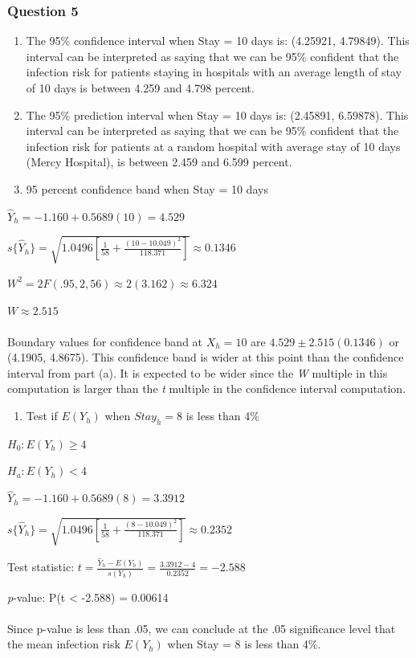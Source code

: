 \documentclass{article}
\providecommand{\tightlist}{%
      \setlength{\itemsep}{0pt}\setlength{\parskip}{0pt}}
\begin{document}
    \subsubsection{Question 5}\label{question-5}

\begin{enumerate}
\def\labelenumi{\alph{enumi}.}
\item
  The 95\% confidence interval when Stay = 10 days is: (4.25921,
  4.79849). This interval can be interpreted as saying that we can be
  95\% confident that the infection risk for patients staying in
  hospitals with an average length of stay of 10 days is between 4.259
  and 4.798 percent.
\item
  The 95\% prediction interval when Stay = 10 days is: (2.45891,
  6.59878). This interval can be interpreted as saying that we can be
  95\% confident that the infection risk for patients at a random
  hospital with average stay of 10 days (Mercy Hospital), is between
  2.459 and 6.599 percent.
\item
  95 percent confidence band when Stay = 10 days
\end{enumerate}

\(\hat{Y}_h = -1.160 + 0.5689 (10) = 4.529\)

\(s\{\hat{Y}_h\} = \sqrt{1.0496 \left[ \frac{1}{58} + \frac{(10 - 10.049)^2}{118.371} \right]} \approx 0.1346\)

\(W^2 = 2F(.95, 2, 56) \approx 2(3.162) \approx 6.324\)

\(W \approx 2.515\)
\mbox{ }\\ \mbox{ }\\
Boundary values for confidence band at \(X_h = 10\) are
\(4.529 \pm 2.515(0.1346)\) or (4.1905, 4.8675). This confidence band is
wider at this point than the confidence interval from part (a). It is
expected to be wider since the \emph{W} multiple in this computation is
larger than the \emph{t} multiple in the confidence interval
computation.

\begin{enumerate}
\def\labelenumi{\alph{enumi}.}
\setcounter{enumi}{3}
\tightlist
\item
  Test if \(E(Y_h)\) when \(Stay_h = 8\) is less than 4\%
\end{enumerate}

\(H_0: E(Y_h) \ge 4\) 

\(H_a: E(Y_h) < 4\)

\(\hat{Y}_h = -1.160 + 0.5689 (8) = 3.3912\)

\(s\{\hat{Y}_h\} = \sqrt{1.0496 \left[ \frac{1}{58} + \frac{(8 - 10.049)^2}{118.371} \right]} \approx 0.2352\)

Test statistic: $t = \frac{\hat{Y}_h - E(Y_h)}{s(Y_h)} = \frac{3.3912 - 4}{0.2352} = -2.588$

\emph{p}-value: P(t \textless{} -2.588) = 0.00614
\mbox{ }\\ \mbox{ }\\
Since p-value is less than .05, we can conclude at the .05 significance level that the mean infection
risk \(E(Y_h)\) when Stay = 8 is less than 4\%.


    
    
    
    
\end{document}
